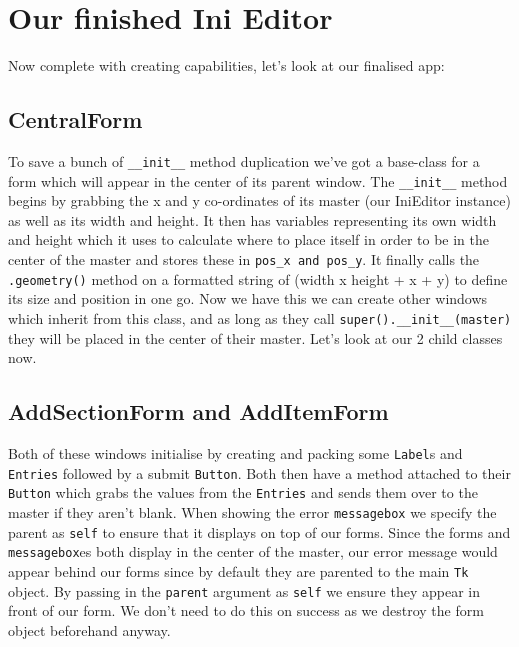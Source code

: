 \documentclass[a4paper,11pt,openany]{book}
\begin{document}
\newpage

\section{Our finished Ini Editor}
Now complete with creating capabilities, let's look at our finalised app:

 

\subsection{CentralForm}
To save a bunch of \lstinline[columns=fixed]{__init__} method duplication we've got a base-class for a form which will appear in the center of its parent window. The \lstinline[columns=fixed]{__init__} method begins by grabbing the x and y co-ordinates of its master (our IniEditor instance) as well as its width and height. It then has variables representing its own width and height which it uses to calculate where to place itself in order to be in the center of the master and stores these in \lstinline[columns=fixed]{pos_x and pos_y}. It finally calls the \lstinline[columns=fixed]{.geometry()} method on a formatted string of (width x height + x + y) to define its size and position in one go. Now we have this we can create other windows which inherit from this class, and as long as they call \lstinline[columns=fixed]{super().__init__(master)} they will be placed in the center of their master. Let's look at our 2 child classes now.

\subsection{AddSectionForm and AddItemForm}
Both of these windows initialise by creating and packing some \lstinline[columns=fixed]{Label}s and \lstinline[columns=fixed]{Entries} followed by a submit \lstinline[columns=fixed]{Button}. Both then have a method attached to their \lstinline[columns=fixed]{Button} which grabs the values from the \lstinline[columns=fixed]{Entries} and sends them over to the master if they aren't blank. When showing the error \lstinline[columns=fixed]{messagebox} we specify the parent as \lstinline[columns=fixed]{self} to ensure that it displays on top of our forms. Since the forms and \lstinline[columns=fixed]{messagebox}es both display in the center of the master, our error message would appear behind our forms since by default they are parented to the main \lstinline[columns=fixed]{Tk} object. By passing in the \lstinline[columns=fixed]{parent} argument as \lstinline[columns=fixed]{self} we ensure they appear in front of our form. We don't need to do this on success as we destroy the form object beforehand anyway. 
\end{document}
